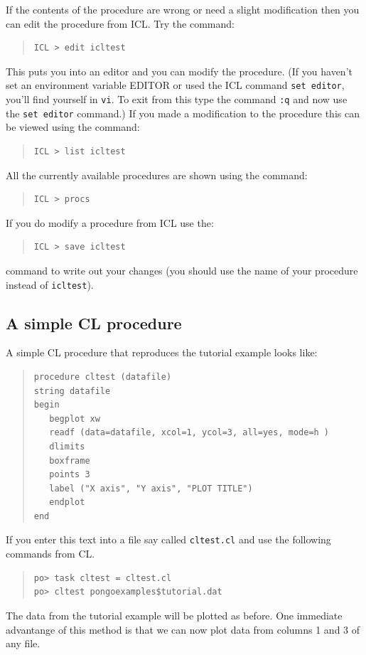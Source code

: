 \documentclass[twoside,11pt]{article}
\renewcommand{\_}{\texttt{\symbol{95}}}
\begin{document}
If the contents of the procedure are wrong or need a slight
modification then you can edit the procedure from ICL. Try the command:
\begin{quote}
\begin{verbatim}
ICL > edit icltest
\end{verbatim}
\end{quote}
This puts you into an editor and you can modify the procedure. (If you
haven't set an environment variable EDITOR or used the ICL command
\verb+set editor+, you'll find yourself in \verb+vi+. To exit from this
type the command \verb+:q+ and now use the \verb+set editor+
command.) If you made a modification to the procedure this can be
viewed using the command:
\begin{quote}
\begin{verbatim}
ICL > list icltest
\end{verbatim}
\end{quote}
All the currently available procedures are shown using the command:
\begin{quote}
\begin{verbatim}
ICL > procs
\end{verbatim}
\end{quote}
If you do modify a procedure from ICL use the:
\begin{quote}
\begin{verbatim}
ICL > save icltest
\end{verbatim}
\end{quote}
command to write out your changes (you should use the name of your procedure
instead of \verb+icltest+).

\subsection{A simple CL procedure}

A simple CL procedure that reproduces the tutorial example looks like:
\begin{quote}
\begin{verbatim}
procedure cltest (datafile)
string datafile
begin
   begplot xw
   readf (data=datafile, xcol=1, ycol=3, all=yes, mode=h )
   dlimits
   boxframe
   points 3
   label ("X axis", "Y axis", "PLOT TITLE")
   endplot
end
\end{verbatim}
\end{quote}
If you enter this text into a file say called \verb+cltest.cl+ and use
the following commands from CL.
\begin{quote}
\begin{verbatim}
po> task cltest = cltest.cl
po> cltest pongoexamples$tutorial.dat
\end{verbatim}
\end{quote}
The data from the tutorial example will be plotted as before. One
immediate advantange of this method is that we can now plot data from
columns 1 and 3 of any file.
\end{document}
